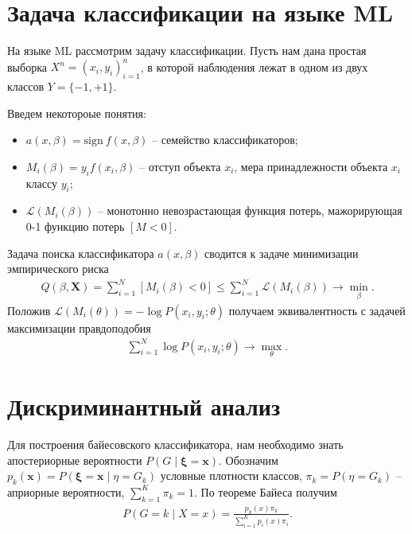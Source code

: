 \documentclass{article}
\DeclareMathOperator*{\argmax}{arg\,max}
\begin{document}

\section{Задача классификации на языке ML}\label{sec:MLClassification}
На языке ML рассмотрим задачу классификации. Пусть нам дана простая выборка $X^n = (x_i, y_i)_{i = 1}^n$, в которой наблюдения лежат в одном из двух классов $Y = \{-1, +1\}$.

Введем некотороые понятия:
\begin{itemize}
  \item $a(x, \beta) = \mathrm{sign}~f(x, \beta)$ -- семейство классификаторов;
  \item $M_i(\beta) = y_i f(x_i, \beta)$ -- отступ объекта $x_i$, мера принадлежности объекта $x_i$ классу $y_i$;
  \item $\mathcal{L}(M_i(\beta))$ -- монотонно невозрастающая функция потерь, мажорирующая 0-1 функцию потерь $[M < 0]$.
\end{itemize}
\bigskip
Задача поиска классификатора $a(x, \beta)$ сводится к задаче минимизации эмпирического риска
\begin{align*}
  Q(\beta, \mathbf{X}) = \sum_{i = 1}^N [M_i(\beta) < 0] \leq \sum_{i = 1}^N \mathcal{L}(M_i(\beta)) \rightarrow \min_\beta.
\end{align*}
Положив $\mathcal{L}(M_i(\theta)) = -\log P(x_i, y_i; \theta)$ получаем эквивалентность с задачей максимизации правдоподобия
\begin{align*}
  \sum_{i = 1}^N \log P(x_i, y_i; \theta) \rightarrow \max_\theta.
\end{align*}

\section{Дискриминантный анализ}

Для построения байесовского классификатора, нам необходимо знать апостериорные вероятности $P(G \mid \boldsymbol{\xi} = \mathbf{x})$. Обозначим $p_k(\mathbf{x}) = P(\boldsymbol{\xi} = \mathbf{x} \mid \eta = G_k)$ условные плотности классов, $\pi_k = P(\eta = G_k)$ -- априорные вероятности, $\sum_{k = 1}^{K} \pi_k = 1$. По теореме Байеса получим
\begin{align*}
   P(G = k \mid X = x) = \frac{p_k(x) \pi_k}{\sum_{i = 1}^K p_i(x)\pi_i}.
\end{align*}
\end{document}
